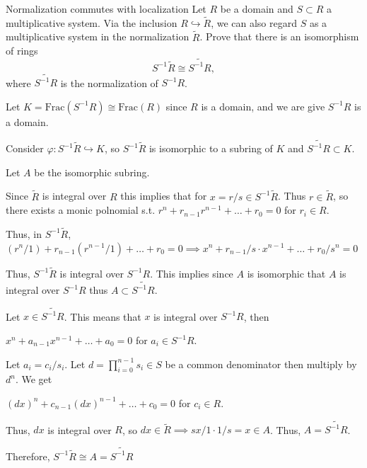 \documentclass[12pt, letterpaper]{article}
\begin{document}
\qh[]
\begin{subproblem}{Normalization commutes with localization}
    Let $R$ be a domain and $S \subset R$ a multiplicative system.
    Via the inclusion $R \hookrightarrow \widetilde{R}$, we can also regard $S$ as a
    multiplicative system in the normalization $\widetilde{R}$. Prove that there is an isomorphism
    of rings
    \[S^{-1}\widetilde{R} \cong \widetilde{S^{-1}R},\]
    where $\widetilde{S^{-1}R}$ is the normalization of $S^{-1}R$.
\end{subproblem}
\begin{problemproof}
    Let $K = \mathrm{Frac}(S^{-1}R) \cong \mathrm{Frac}(R)$ since $R$ is a domain, and we are give $S^{-1}R$ is a domain. 
    
    Consider $\varphi : S^{-1}\widetilde{R} \hookrightarrow K$, so $S^{-1}\widetilde{R}$ is isomorphic to a subring of $K$ and $\widetilde{S^{-1}R} \subset K$.

    Let $A$ be the isomorphic subring.

    Since $\widetilde{R}$ is integral over $R$ this implies that for $x=r/s \in S^{-1}\widetilde{R}$. Thus $r \in \widetilde{R}$, so there exists a monic polnomial s.t. 
    $r^n+r_{n-1}r^{n-1}+\dots+r_0=0$ for $r_i \in R$.

    Thus, in $S^{-1}\widetilde{R}$, $(r^n/1)+r_{n-1}(r^{n-1}/1)+\dots+r_0=0 \implies x^n+r_{n-1}/s \cdot x^{n-1} + \dots + r_0/s^n=0$

    Thus, $S^{-1}\widetilde{R}$ is integral over $S^{-1}R$. This implies since $A$ is isomorphic that $A$ is integral over $S^{-1}R$ thus $A \subset \widetilde{S^{-1}R}$.

    Let $x \in \widetilde{S^{-1}R}$. This means that $x$ is integral over $S^{-1}R$, then
    
    $x^n+a_{n-1}x^{n-1}+\dots+a_0 = 0$ for $a_i \in S^{-1}R$.

    Let $a_i=c_i/s_i$. Let $d=\prod_{i=0}^{n-1}s_i \in S$ be a common denominator then multiply by $d^n$. We get

    $(dx)^n+c_{n-1}(dx)^{n-1} +  \dots + c_0=0$ for $c_i \in R$.

    Thus, $dx$ is integral over $R$, so $dx \in \widetilde{R} \implies sx/1 \cdot 1/s = x \in A$. Thus, $A=\widetilde{S^{-1}R}$.

    Therefore, $S^{-1}\widetilde{R} \cong A = \widetilde{S^{-1}R}$
\end{problemproof}
\end{document}
